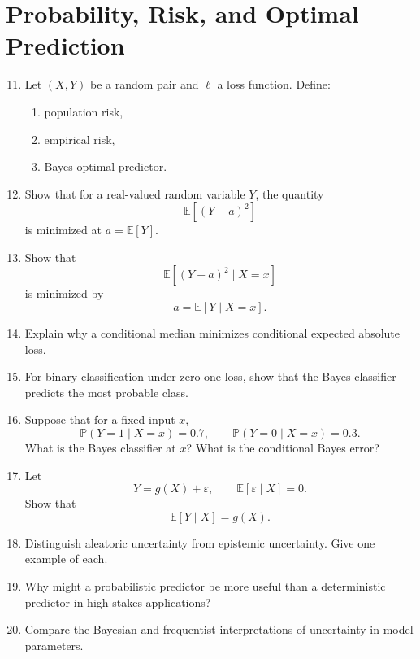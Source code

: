 \section*{Probability, Risk, and Optimal Prediction}

\begin{enumerate}
\setcounter{enumi}{10}
    \item Let $(X,Y)$ be a random pair and $\ell$ a loss function. Define:
    \begin{enumerate}
        \item population risk,
        \item empirical risk,
        \item Bayes-optimal predictor.
    \end{enumerate}

    \item Show that for a real-valued random variable $Y$, the quantity
    \[
    \mathbb E[(Y-a)^2]
    \]
    is minimized at $a=\mathbb E[Y]$.

    \item Show that
    \[
    \mathbb E[(Y-a)^2\mid X=x]
    \]
    is minimized by
    \[
    a=\mathbb E[Y\mid X=x].
    \]

    \item Explain why a conditional median minimizes conditional expected absolute loss.

    \item For binary classification under zero-one loss, show that the Bayes classifier predicts the most probable class.

    \item Suppose that for a fixed input $x$,
    \[
    \mathbb P(Y=1\mid X=x)=0.7,\qquad \mathbb P(Y=0\mid X=x)=0.3.
    \]
    What is the Bayes classifier at $x$? What is the conditional Bayes error?

    \item Let
    \[
    Y=g(X)+\varepsilon,\qquad \mathbb E[\varepsilon\mid X]=0.
    \]
    Show that
    \[
    \mathbb E[Y\mid X]=g(X).
    \]

    \item Distinguish aleatoric uncertainty from epistemic uncertainty. Give one example of each.

    \item Why might a probabilistic predictor be more useful than a deterministic predictor in high-stakes applications?

    \item Compare the Bayesian and frequentist interpretations of uncertainty in model parameters.
\end{enumerate}

